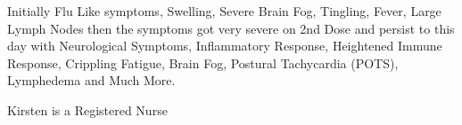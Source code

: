 Initially Flu Like symptoms, Swelling, Severe Brain Fog, Tingling, Fever, Large
Lymph Nodes then the symptoms got very severe on 2nd Dose and persist to this
day with Neurological Symptoms, Inflammatory Response, Heightened Immune
Response, Crippling Fatigue, Brain Fog, Postural Tachycardia (POTS), Lymphedema
and Much More.

Kirsten is a Registered Nurse

